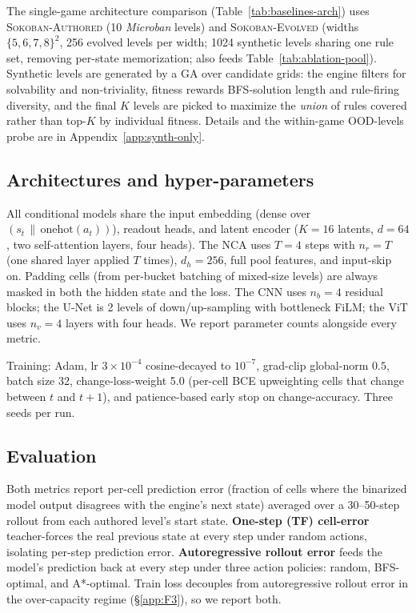 The single-game architecture comparison
(Table~\ref{tab:baselines-arch}) uses \textsc{Sokoban-Authored} (10
\textit{Microban} levels) and \textsc{Sokoban-Evolved} (widths
$\{5,6,7,8\}^2$, 256 evolved levels per width; 1024 synthetic levels
sharing one rule set, removing per-state memorization;
also feeds Table~\ref{tab:ablation-pool}). Synthetic levels are
generated by a GA over candidate grids: the engine filters for
solvability and non-triviality, fitness rewards BFS-solution length
and rule-firing diversity, and the final $K$ levels are picked to
maximize the \emph{union} of rules covered rather than top-$K$ by
individual fitness. Details and the within-game OOD-levels probe are
in Appendix~\ref{app:synth-only}.

\subsection{Architectures and hyper-parameters}

All conditional models share the input embedding (dense over
$(s_t \,\|\, \mathrm{onehot}(a_t))$), readout heads, and latent encoder
($K{=}16$ latents, $d{=}64$, two self-attention layers, four heads).
The NCA uses $T{=}4$ steps with $n_r{=}T$ (one shared layer applied
$T$ times), $d_h{=}256$, full pool features, and input-skip on.
Padding cells (from per-bucket batching of mixed-size levels) are
always masked in both the hidden state and the loss. The CNN uses
$n_b{=}4$ residual blocks; the U-Net is 2 levels of down/up-sampling
with bottleneck FiLM; the ViT uses $n_v{=}4$ layers with four heads.
We report parameter counts alongside every metric.

Training: Adam, lr $3 \times 10^{-4}$ cosine-decayed to $10^{-7}$,
grad-clip global-norm $0.5$, batch size 32, change-loss-weight 5.0
(per-cell BCE upweighting cells that change between $t$ and $t+1$),
and patience-based early stop on change-accuracy. Three seeds per run.

\subsection{Evaluation}

Both metrics report per-cell prediction error (fraction of cells
where the binarized model output disagrees with the engine's next
state) averaged over a 30--50-step rollout from each authored
level's start state.
\textbf{One-step (TF) cell-error} teacher-forces the real previous
state at every step under random actions, isolating per-step
prediction error.
\textbf{Autoregressive rollout error} feeds the model's prediction
back at every step under three action policies: random, BFS-optimal,
and A*-optimal.
Train loss decouples from autoregressive rollout error in the
over-capacity regime (\S\ref{app:F3}), so we report both.

